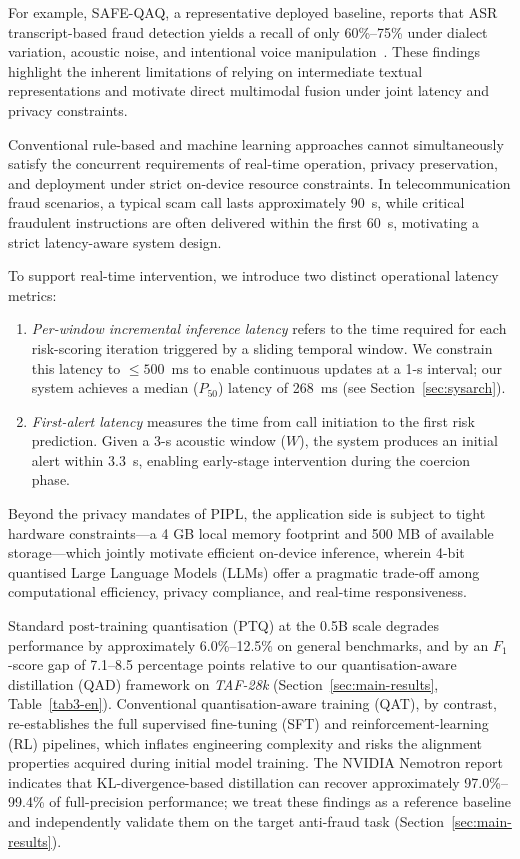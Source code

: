 \documentclass[a4paper,fleqn]{cas-sc}
\begin{document}
For example, SAFE-QAQ, a representative deployed baseline, reports that ASR transcript-based fraud detection yields a recall of only 60\%--75\% under dialect variation, acoustic noise, and intentional voice manipulation~\citep{2}. These findings highlight the inherent limitations of relying on intermediate textual representations and motivate direct multimodal fusion under joint latency and privacy constraints.

Conventional rule-based and machine learning approaches cannot simultaneously satisfy the concurrent requirements of real-time operation, privacy preservation, and deployment under strict on-device resource constraints. In telecommunication fraud scenarios, a typical scam call lasts approximately 90~s, while critical fraudulent instructions are often delivered within the first 60~s, motivating a strict latency-aware system design.

To support real-time intervention, we introduce two distinct operational latency metrics:
\begin{enumerate}
    \item \textit{Per-window incremental inference latency} refers to the time required for each risk-scoring iteration triggered by a sliding temporal window. We constrain this latency to $\le 500$~ms to enable continuous updates at a 1-s interval; our system achieves a median ($P_{50}$) latency of 268~ms (see Section~\ref{sec:sysarch}).
    \item \textit{First-alert latency} measures the time from call initiation to the first risk prediction. Given a 3-s acoustic window ($W$), the system produces an initial alert within 3.3~s, enabling early-stage intervention during the coercion phase.
\end{enumerate}

Beyond the privacy mandates of PIPL, the application side is subject to tight hardware constraints---a 4 GB local memory footprint and 500 MB of available storage---which jointly motivate efficient on-device inference, wherein 4-bit quantised Large Language Models (LLMs) offer a pragmatic trade-off among computational efficiency, privacy compliance, and real-time responsiveness.



Standard post-training quantisation (PTQ) at the 0.5B scale degrades performance by approximately 6.0\%--12.5\% on general benchmarks, and by an $F_1$-score gap of 7.1--8.5 percentage points relative to our quantisation-aware distillation (QAD) framework on \textit{TAF-28k} (Section~\ref{sec:main-results}, Table~\ref{tab3-en}). Conventional quantisation-aware training (QAT), by contrast, re-establishes the full supervised fine-tuning (SFT) and reinforcement-learning (RL) pipelines, which inflates engineering complexity and risks the alignment properties acquired during initial model training. The NVIDIA Nemotron report~\citep{3} indicates that KL-divergence-based distillation can recover approximately 97.0\%--99.4\% of full-precision performance; we treat these findings as a reference baseline and independently validate them on the target anti-fraud task (Section~\ref{sec:main-results}).
\end{document}
